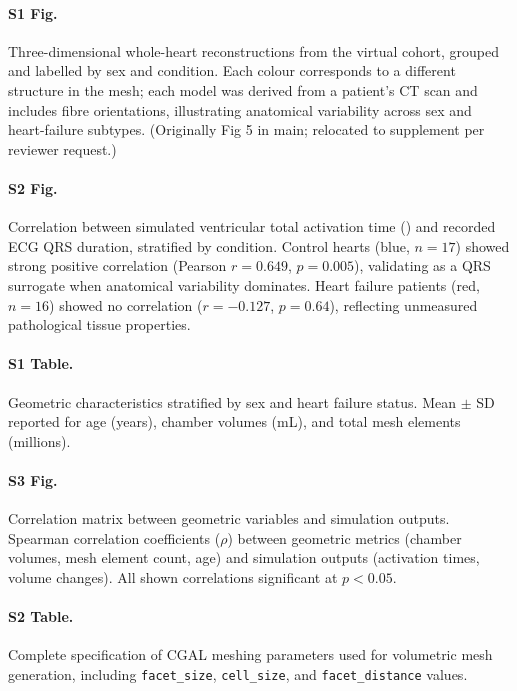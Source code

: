 \documentclass[10pt,letterpaper]{article}
\begin{document}
\paragraph{S1 Fig.}
Three-dimensional whole-heart reconstructions from the virtual cohort, grouped and
labelled by sex and condition. Each colour corresponds to a different structure in the
mesh; each model was derived from a patient's CT scan and includes fibre orientations,
illustrating anatomical variability across sex and heart-failure subtypes. (Originally
Fig 5 in main; relocated to supplement per reviewer request.)

\paragraph{S2 Fig.}
Correlation between simulated ventricular total activation time () and recorded
ECG QRS duration, stratified by condition. Control hearts (blue, $n=17$) showed strong
positive correlation (Pearson $r = 0.649$, $p = 0.005$), validating  as a QRS surrogate
when anatomical variability dominates. Heart failure patients (red, $n=16$) showed no
correlation ($r = -0.127$, $p = 0.64$), reflecting unmeasured pathological tissue properties.

\paragraph{S1 Table.}
Geometric characteristics stratified by sex and heart failure status. Mean $\pm$ SD reported
for age (years), chamber volumes (mL), and total mesh elements (millions).

\paragraph{S3 Fig.}
Correlation matrix between geometric variables and simulation outputs. Spearman correlation
coefficients ($\rho$) between geometric metrics (chamber volumes, mesh element count, age)
and simulation outputs (activation times, volume changes). All shown correlations significant
at $p < 0.05$.

\paragraph{S2 Table.}
Complete specification of CGAL meshing parameters used for volumetric mesh generation,
including \texttt{facet\_size}, \texttt{cell\_size}, and \texttt{facet\_distance} values.
\end{document}
